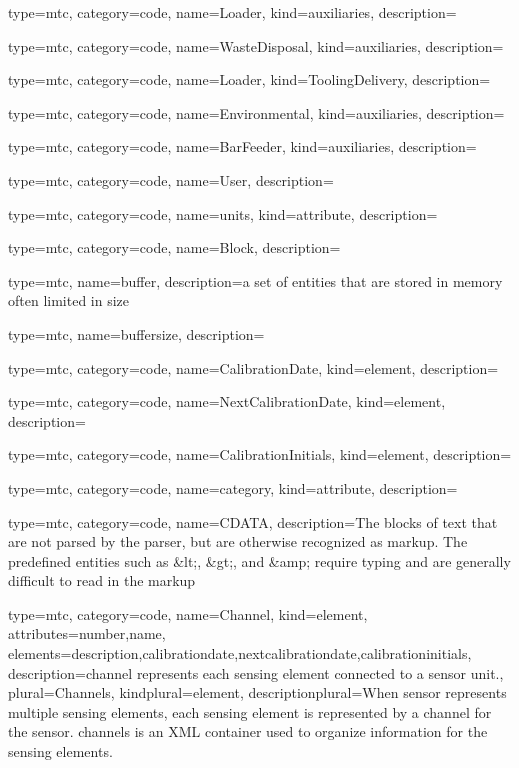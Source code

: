 {
  type=mtc,
  category=code,
  name={Loader},
  kind={auxiliaries},
  description={}
}


{
  type=mtc,
  category=code,
  name={WasteDisposal},
  kind={auxiliaries},
  description={}
}


{
  type=mtc,
  category=code,
  name={Loader},
  kind={ToolingDelivery},
  description={}
}


{
  type=mtc,
  category=code,
  name={Environmental},
  kind={auxiliaries},
  description={}
}


{
  type=mtc,
  category=code,
  name={BarFeeder},
  kind={auxiliaries},
  description={}
}


{
  type=mtc,
  category=code,
  name={User},
  description={}
}


{
  type=mtc,
  category=code,
  name={units},
  kind={attribute},
  description={}
}


{
  type=mtc,
  category=code,
  name={Block},
  description={}
}


{
  type=mtc,
  name=buffer,
  description={a set of entities that are stored in memory often limited in size}
}


{
  type=mtc,
  name=buffersize,
  description={}
}


{
  type=mtc,
  category=code,
  name={CalibrationDate},
  kind={element},
  description={}
}


{
  type=mtc,
  category=code,
  name={NextCalibrationDate},
  kind={element},
  description={}
}


{
  type=mtc,
  category=code,
  name={CalibrationInitials},
  kind={element},
  description={}
}


{
  type=mtc,
  category=code,
  name={category},
  kind={attribute},
  description={}
}


{
  type=mtc,
  category=code,
  name=CDATA,
  description={The blocks of text that are not parsed by the parser, but are otherwise recognized as markup. The predefined entities such as \&lt;, \&gt;, and \&amp; require typing and are generally difficult to read in the markup}
}


{
  type=mtc,
  category=code,
  name={Channel},
  kind={element},
  attributes={\gls{number},\gls{name}},
  elements={\gls{description},\gls{calibrationdate},\gls{nextcalibrationdate},\gls{calibrationinitials}},
  description={\gls{channel} represents each \gls{sensing element} connected to a \gls{sensor unit}.},
  plural={Channels},
  kindplural={element},
  descriptionplural={When \gls{sensor} represents multiple \glspl{sensing element}, each \gls{sensing element} is represented by a \gls{channel} for the \gls{sensor}. \glspl{channel} is an XML container used to organize information for the \glspl{sensing element}. }
}


